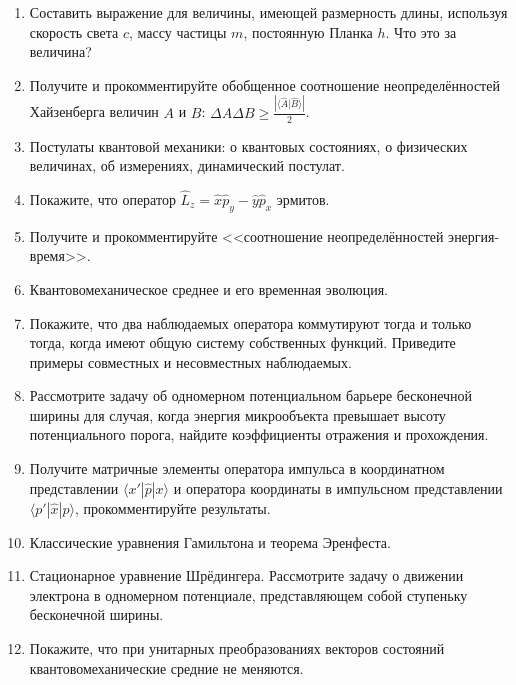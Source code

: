 \documentclass[12pt]{article}
\begin{document}
\begin{enumerate}
\item\label{_12}
Составить выражение для величины, имеющей размерность длины, используя скорость света $c$, массу частицы $m$, постоянную Планка $h$. Что это за величина?

\item\label{_13}
Получите и прокомментируйте обобщенное соотношение неопределённостей Хайзенберга величин $A$ и $B$: $\Delta A\Delta B \ge \frac{\left|\langle\hat{A} | \hat{B}\rangle\right|}{2}$.

\item\label{_14}
Постулаты квантовой механики: о квантовых состояниях, о физических величинах, об измерениях, динамический постулат.

\item\label{_15}
Покажите, что оператор $\hat{L}_z = \hat{x}\hat{p}_y-\hat{y}\hat{p}_x$ эрмитов.

\item\label{_16}
Получите и прокомментируйте <<соотношение неопределённостей энергия-время>>.

\item\label{_17}
Квантовомеханическое среднее и его временная эволюция.

\item\label{_18}
Покажите, что два наблюдаемых оператора коммутируют тогда и только тогда, когда имеют общую систему собственных функций. Приведите примеры совместных и несовместных наблюдаемых.

\item\label{_19}
Рассмотрите задачу об одномерном потенциальном барьере бесконечной ширины для случая, когда энергия микрообъекта превышает высоту потенциального порога, найдите коэффициенты отражения и прохождения.

\item\label{_20}
Получите матричные элементы оператора импульса в координатном представлении $\langle x' | \hat{p} | x\rangle$ и оператора координаты в импульсном представлении $\langle p' | \hat{x} | p \rangle$, прокомментируйте результаты.

\item\label{_21}
Классические уравнения Гамильтона и теорема Эренфеста.

\item\label{_22}
Стационарное уравнение Шрёдингера. Рассмотрите задачу о движении электрона в одномерном потенциале, представляющем собой ступеньку бесконечной ширины.

\item\label{_23}
Покажите, что при унитарных преобразованиях векторов состояний квантовомеханические средние не меняются.


\end{enumerate}
\end{document}
